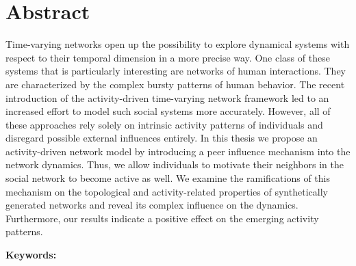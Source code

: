 \chapter*{Abstract}
\label{cha:abstract}

Time-varying networks open up the possibility to explore dynamical systems with respect to their temporal dimension in a more precise way.
One class of these systems that is particularly interesting are networks of human interactions.
They are characterized by the complex bursty patterns of human behavior.
The recent introduction of the activity-driven time-varying network framework led to an increased effort to model such social systems more accurately.
However, all of these approaches rely solely on intrinsic activity patterns of individuals and disregard possible external influences entirely.
In this thesis we propose an activity-driven network model by introducing a peer influence mechanism into the network dynamics.
Thus, we allow individuals to motivate their neighbors in the social network to become active as well.
We examine the ramifications of this mechanism on the topological and activity-related properties of synthetically generated networks and reveal its complex influence on the dynamics.
Furthermore, our results indicate a positive effect on the emerging activity patterns.


\textbf{Keywords:} \mykeywords
